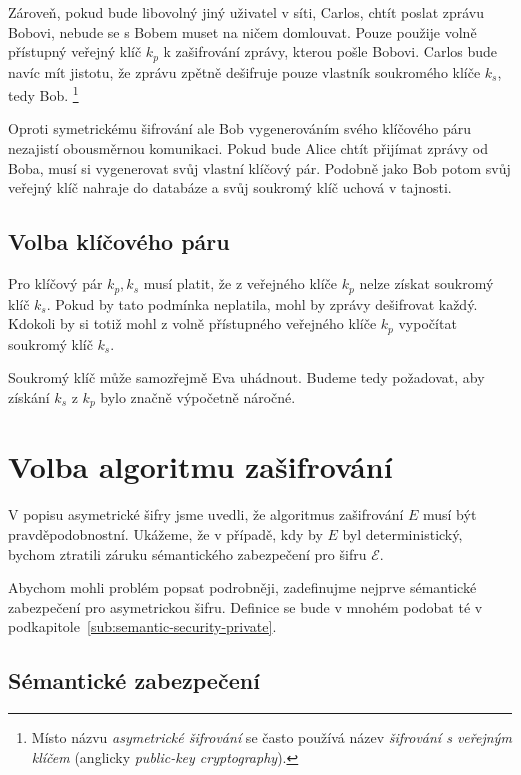 \documentclass[
  program=infoi,
  biblatex,
  figures=false,
  glossaries,
  index
]{kidiplom}
\begin{document}
    Zároveň, pokud bude libovolný jiný uživatel v síti, Carlos, chtít poslat zprávu Bobovi, nebude se s Bobem muset na ničem domlouvat.
    Pouze použije volně přístupný veřejný klíč $k_p$ k zašifrování zprávy, kterou pošle Bobovi.
    Carlos bude navíc mít jistotu, že zprávu zpětně dešifruje pouze vlastník soukromého klíče $k_s$, tedy Bob.
    \footnote{Místo názvu \emph{asymetrické šifrování} se často používá
    název \emph{šifrování s veřejným klíčem} (anglicky \emph{public-key cryptography}).}

    Oproti symetrickému šifrování ale Bob vygenerováním svého klíčového páru nezajistí obousměrnou komunikaci.
    Pokud bude Alice chtít přijímat zprávy od Boba, musí si vygenerovat svůj vlastní klíčový pár.
    Podobně jako Bob potom svůj veřejný klíč nahraje do databáze a svůj soukromý klíč uchová v tajnosti.


    \subsection{Volba klíčového páru}

        Pro klíčový pár $k_p, k_s$ musí platit, že z veřejného klíče $k_p$ nelze získat soukromý klíč $k_s$.
        Pokud by tato podmínka neplatila, mohl by zprávy dešifrovat každý.
        Kdokoli by si totiž mohl z volně přístupného veřejného klíče $k_p$ vypočítat soukromý klíč $k_s$.

        Soukromý klíč může samozřejmě Eva uhádnout.
        Budeme tedy požadovat, aby získání $k_s$ z $k_p$ bylo značně výpočetně náročné.


\section{Volba algoritmu zašifrování}

    V popisu asymetrické šifry jsme uvedli, že algoritmus zašifrování $E$ musí být pravděpodobnostní.
    Ukážeme, že v případě, kdy by $E$ byl deterministický, bychom ztratili záruku sémantického zabezpečení pro šifru $\mathcal{E}$.

    Abychom mohli problém popsat podrobněji, zadefinujme nejprve sémantické zabezpečení pro asymetrickou šifru.
    Definice se bude v mnohém podobat té v podkapitole~\ref{sub:semantic-security-private}.

    \subsection{Sémantické zabezpečení}\label{sub:semantic-security-public}
\end{document}
